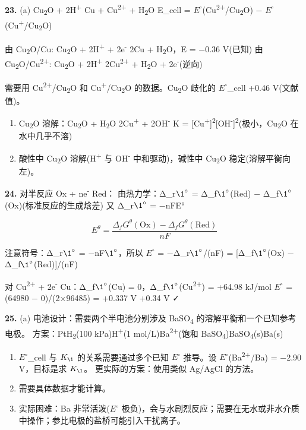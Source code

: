 \textbf{23.}
(a) Cu\textsubscript{2}O + 2H\textsuperscript{+} \箭 Cu + Cu\textsuperscript{2+} + H\textsubscript{2}O
E\_cell = \(E^{\circ}\)(Cu\textsuperscript{2+}/Cu\textsubscript{2}O) − \(E^{\circ}\)(Cu\textsuperscript{+}/Cu\textsubscript{2}O)

由 Cu\textsubscript{2}O/Cu: Cu\textsubscript{2}O + 2H\textsuperscript{+} + 2e\textsuperscript{-} \箭 2Cu + H\textsubscript{2}O，E = −0.36 V(已知)
由 Cu\textsubscript{2}O/Cu\textsuperscript{2+}: Cu\textsubscript{2}O + 2H\textsuperscript{+} \箭 2Cu\textsuperscript{2+} + H\textsubscript{2}O + 2e\textsuperscript{-}(逆向)

需要用 Cu\textsuperscript{2+}/Cu\textsubscript{2}O 和 Cu\textsuperscript{+}/Cu\textsubscript{2}O 的数据。Cu\textsubscript{2}O 歧化的 \(E^{\circ}\)\_cell  +0.46 V(文献值)。

\begin{enumerate}
\def\labelenumi{(\alph{enumi})}
\setcounter{enumi}{1}
\item
  Cu\textsubscript{2}O 溶解：Cu\textsubscript{2}O + H\textsubscript{2}O \衡 2Cu\textsuperscript{+} + 2OH\textsuperscript{-}
  K = {[}Cu\textsuperscript{+}{]}\textsuperscript{2}{[}OH\textsuperscript{-}{]}\textsuperscript{2}(极小，Cu\textsubscript{2}O 在水中几乎不溶)
\item
  酸性中 Cu\textsubscript{2}O 溶解(H\textsuperscript{+} 与 OH\textsuperscript{-} 中和驱动)，碱性中 Cu\textsubscript{2}O 稳定(溶解平衡向左)。
\end{enumerate}

\textbf{24.} 对半反应 Ox + ne\textsuperscript{-} \箭 Red：
由热力学：Δ\_r\(\1^{\circ}\) = Δ\_f\(\1^{\circ}\)(Red) − Δ\_f\(\1^{\circ}\)(Ox)(标准反应的生成焓差)
又 Δ\_r\(\1^{\circ}\) = −nFE°

\[E^\theta = \frac{\Delta_f G^\theta(\mathrm{Ox}) - \Delta_f G^\theta(\mathrm{Red})}{nF}\]

注意符号：Δ\_r\(\1^{\circ}\) = −nF\(\1^{\circ}\)，所以 \(E^{\circ}\) = −Δ\_r\(\1^{\circ}\)/(nF) = {[}Δ\_f\(\1^{\circ}\)(Ox) − Δ\_f\(\1^{\circ}\)(Red){]}/(nF)

对 Cu\textsuperscript{2+} + 2e\textsuperscript{-} \箭 Cu：Δ\_f\(\1^{\circ}\)(Cu) = 0，Δ\_f\(\1^{\circ}\)(Cu\textsuperscript{2+}) = +64.98 kJ/mol
\(E^{\circ}\) = (64980 − 0)/(2×96485) = +0.337 V  +0.34 V ✓

\textbf{25.}
(a) 电池设计：需要两个半电池分别涉及 BaSO\textsubscript{4} 的溶解平衡和一个已知参考电极。
方案：Pt\textbar H\textsubscript{2}(100 kPa)\textbar H\textsuperscript{+}(1 mol/L)\textbar\textbar Ba\textsuperscript{2+}(饱和 BaSO\textsubscript{4})\textbar BaSO\textsubscript{4}(s)\textbar Ba(s)

\begin{enumerate}
\def\labelenumi{(\alph{enumi})}
\setcounter{enumi}{1}
\item
  \(E^{\circ}\)\_cell 与 \(K_{\1}\) 的关系需要通过多个已知 \(E^{\circ}\) 推导。设 \(E^{\circ}\)(Ba\textsuperscript{2+}/Ba) = −2.90 V，目标是求 \(K_{\1}\)。
  更实际的方案：使用类似 Ag/AgCl 的方法。
\item
  需要具体数据才能计算。
\item
  实际困难：Ba 非常活泼(\(E^{\circ}\) 极负)，会与水剧烈反应；需要在无水或非水介质中操作；参比电极的盐桥可能引入干扰离子。
\end{enumerate}
